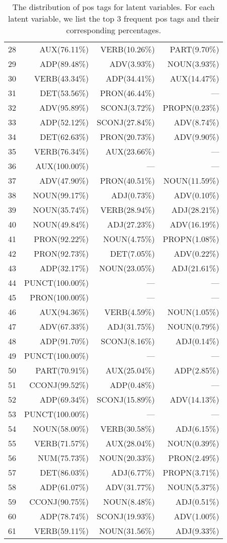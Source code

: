 \begin{table}[htbp]
\begin{tabular}{lrrr}
28& AUX(76.11\%)& VERB(10.26\%)& PART(9.70\%)\\
29& ADP(89.48\%)& ADV(3.93\%)& NOUN(3.93\%)\\
30& VERB(43.34\%)& ADP(34.41\%)& AUX(14.47\%)\\
31& DET(53.56\%)& PRON(46.44\%)& ---\\
32& ADV(95.89\%)& SCONJ(3.72\%)& PROPN(0.23\%)\\
33& ADP(52.12\%)& SCONJ(27.84\%)& ADV(8.74\%)\\
34& DET(62.63\%)& PRON(20.73\%)& ADV(9.90\%)\\
35& VERB(76.34\%)& AUX(23.66\%)& ---\\
36& AUX(100.00\%)& ---& ---\\
37& ADV(47.90\%)& PRON(40.51\%)& NOUN(11.59\%)\\
38& NOUN(99.17\%)& ADJ(0.73\%)& ADV(0.10\%)\\
39& NOUN(35.74\%)& VERB(28.94\%)& ADJ(28.21\%)\\
40& NOUN(49.84\%)& ADJ(27.23\%)& ADV(16.19\%)\\
41& PRON(92.22\%)& NOUN(4.75\%)& PROPN(1.08\%)\\
42& PRON(92.73\%)& DET(7.05\%)& ADV(0.22\%)\\
43& ADP(32.17\%)& NOUN(23.05\%)& ADJ(21.61\%)\\
44& PUNCT(100.00\%)& ---& ---\\
45& PRON(100.00\%)& ---& ---\\
46& AUX(94.36\%)& VERB(4.59\%)& NOUN(1.05\%)\\
47& ADV(67.33\%)& ADJ(31.75\%)& NOUN(0.79\%)\\
48& ADP(91.70\%)& SCONJ(8.16\%)& ADJ(0.14\%)\\
49& PUNCT(100.00\%)& ---& ---\\
50& PART(70.91\%)& AUX(25.04\%)& ADP(2.85\%)\\
51& CCONJ(99.52\%)& ADP(0.48\%)& ---\\
52& ADP(69.34\%)& SCONJ(15.89\%)& ADV(14.13\%)\\
53& PUNCT(100.00\%)& ---& ---\\
54& NOUN(58.00\%)& VERB(30.58\%)& ADJ(6.15\%)\\
55& VERB(71.57\%)& AUX(28.04\%)& NOUN(0.39\%)\\
56& NUM(75.73\%)& NOUN(20.33\%)& PRON(2.49\%)\\
57& DET(86.03\%)& ADJ(6.77\%)& PROPN(3.71\%)\\
58& ADP(61.07\%)& ADV(31.77\%)& NOUN(5.37\%)\\
59& CCONJ(90.75\%)& NOUN(8.48\%)& ADJ(0.51\%)\\
60& ADP(78.74\%)& SCONJ(19.93\%)& ADV(1.00\%)\\
61& VERB(59.11\%)& NOUN(31.56\%)& ADJ(9.33\%)\\ 
\bottomrule
\end{tabular}
\caption{The distribution of pos tags for latent variables. For each latent variable, we list the top 3 frequent pos tags and their corresponding percentages. }
\end{table}
